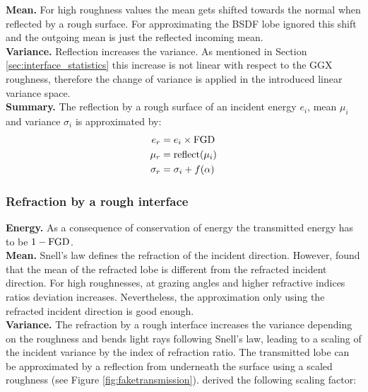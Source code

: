 %

\textbf{Mean.} For high roughness values the mean gets shifted towards the normal when reflected by a rough surface. For approximating the BSDF lobe \textcite{belcour2018} ignored this shift and the outgoing mean is just the reflected incoming mean.\\

\textbf{Variance.} Reflection increases the variance. As mentioned in Section \ref{sec:interface_statistics} this increase is not linear with respect to the GGX roughness, therefore the change of  variance is applied in the introduced linear variance space.\\

\textbf{Summary.} The reflection by a rough surface of an incident energy $e_i$, mean $\mu_i$ and variance $\sigma_i$ is approximated by:
\begin{equation}
    \begin{aligned}
        e_r &= e_i \times \operatorname{FGD}\\
        \mu_r &= \operatorname{reflect}(\mu_i)\\
        \sigma_r &= \sigma_i + f(\alpha)
    \end{aligned}
\end{equation}

\subsubsection{Refraction by a rough interface}
\label{sec:rough_refraction}

\textbf{Energy.} As a consequence of conservation of energy the transmitted energy has to be $1 - \operatorname{FGD}$.\\

\textbf{Mean.} Snell's law defines the refraction of the incident direction. However, \textcite{belcour2018} found that the mean of the refracted lobe is different from the refracted incident direction. For high roughnesses, at grazing angles and higher refractive indices ratios deviation increases. Nevertheless, the approximation only using the refracted incident direction is good enough.\\

\textbf{Variance.} The refraction by a rough interface increases the variance depending on the roughness and bends light rays following Snell's law, leading to a scaling of the incident variance by the index of refraction ratio. The transmitted lobe can be approximated by a reflection from underneath the surface using a scaled roughness (see Figure \ref{fig:faketransmission}). 
\textcite{belcour2018} derived the following scaling factor:

